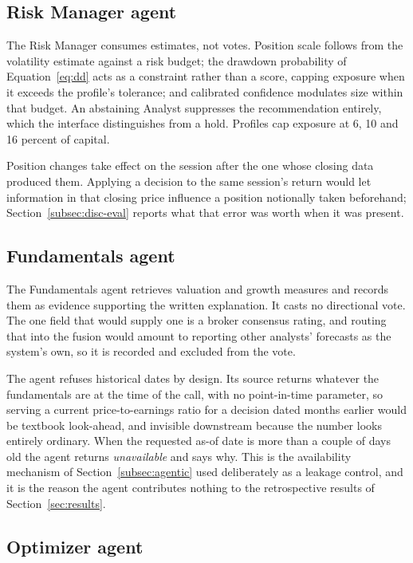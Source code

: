 \documentclass[pdflatex,sn-apa]{sn-jnl}%
\theoremstyle{thmstyleone}%
\theoremstyle{thmstyletwo}%
\theoremstyle{thmstylethree}%
\begin{document}
\subsection{Risk Manager agent}\label{subsec:riskmgr}

The Risk Manager consumes estimates, not votes. Position scale follows from the
volatility estimate against a risk budget; the drawdown probability of
Equation~\eqref{eq:dd} acts as a constraint rather than a score, capping
exposure when it exceeds the profile's tolerance; and calibrated confidence
modulates size within that budget. An abstaining Analyst suppresses the
recommendation entirely, which the interface distinguishes from a hold.
Profiles cap exposure at 6, 10 and 16 percent of capital.

Position changes take effect on the session after the one whose closing data
produced them. Applying a decision to the same session's return would let
information in that closing price influence a position notionally taken
beforehand; Section~\ref{subsec:disc-eval} reports what that error was worth
when it was present.

\subsection{Fundamentals agent}\label{subsec:fundamentals}

The Fundamentals agent retrieves valuation and growth measures and records them
as evidence supporting the written explanation. It casts no directional vote.
The one field that would supply one is a broker consensus rating, and routing
that into the fusion would amount to reporting other analysts' forecasts as the
system's own, so it is recorded and excluded from the vote.

The agent refuses historical dates by design. Its source returns whatever the
fundamentals are at the time of the call, with no point-in-time parameter, so
serving a current price-to-earnings ratio for a decision dated months earlier
would be textbook look-ahead, and invisible downstream because the number looks
entirely ordinary. When the requested as-of date is more than a couple of days
old the agent returns \emph{unavailable} and says why. This is the availability
mechanism of Section~\ref{subsec:agentic} used deliberately as a leakage
control, and it is the reason the agent contributes nothing to the retrospective
results of Section~\ref{sec:results}.

\subsection{Optimizer agent}\label{subsec:optimizer}
\end{document}
